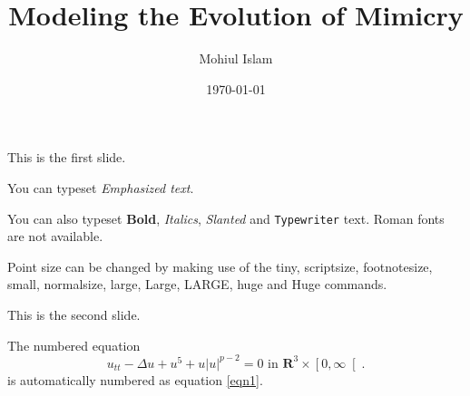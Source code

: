 \documentclass[letterpaper,landscape,titlepage,leqno]{slides}%
\begin{document}
\title{Modeling the Evolution of Mimicry}
\author{Mohiul Islam}
\date{\today}
\maketitle
\begin{slide}{1}

This is the first slide.

You can typeset \emph{Emphasized text}.

You can also typeset  \textbf{Bold}, \textit{Italics},
\textsl{Slanted} and \texttt{Typewriter} text. Roman fonts are not
available.

Point size can be changed by making use of the {\tiny tiny},
{\scriptsize scriptsize}, {\footnotesize footnotesize}, {\small
small}, {\normalsize normalsize}, {\large large}, {\Large Large},
{\LARGE LARGE}, {\huge huge} and {\Huge Huge} commands.

\end{slide}
\begin{slide}{2}
This is the second slide.

The numbered equation
\begin{equation}
u_{tt}-\Delta u+u^{5}+u\left|  u\right|  ^{p-2}=0\text{ in }\mathbf{R}%
^{3}\times\left[  0,\infty\right[  .\label{eqn1}%
\end{equation}
is automatically numbered as equation \ref{eqn1}.

\end{slide}
\end{document}
